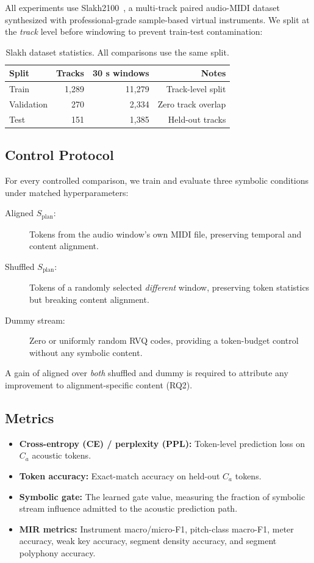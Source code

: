 \documentclass[11pt]{article}
\newcommand{\splan}{$S_{\mathrm{plan}}$}
\newcommand{\Camath}{C_a}
\begin{document}
All experiments use Slakh2100~\citep{manilow2019slakh}, a multi-track paired
audio-MIDI dataset synthesized with professional-grade sample-based virtual instruments.
We split at the \emph{track} level before windowing to prevent train-test contamination:

\begin{table}[h]
\centering
\small
\begin{tabular}{lrrr}
\toprule
Split & Tracks & 30 s windows & Notes \\
\midrule
Train      & 1,289 & 11,279 & Track-level split \\
Validation & 270   & 2,334  & Zero track overlap \\
Test       & 151   & 1,385  & Held-out tracks \\
\bottomrule
\end{tabular}
\caption{Slakh dataset statistics.  All comparisons use the same split.}
\label{tab:dataset}
\end{table}

\subsection{Control Protocol}

For every controlled comparison, we train and evaluate three symbolic conditions under
matched hyperparameters:
\begin{description}
  \item[Aligned \splan{}:] Tokens from the audio window's own MIDI file, preserving
    temporal and content alignment.
  \item[Shuffled \splan{}:] Tokens of a randomly selected \emph{different} window,
    preserving token statistics but breaking content alignment.
  \item[Dummy stream:] Zero or uniformly random RVQ codes, providing a token-budget
    control without any symbolic content.
\end{description}

A gain of aligned over \emph{both} shuffled and dummy is required to attribute any
improvement to alignment-specific content (RQ2).

\subsection{Metrics}

\begin{itemize}
  \item \textbf{Cross-entropy (CE) / perplexity (PPL):} Token-level prediction loss
    on $\Camath$ acoustic tokens.
  \item \textbf{Token accuracy:} Exact-match accuracy on held-out $\Camath$ tokens.
  \item \textbf{Symbolic gate:} The learned gate value, measuring the fraction of
    symbolic stream influence admitted to the acoustic prediction path.
  \item \textbf{MIR metrics:} Instrument macro/micro-F1, pitch-class macro-F1, meter
    accuracy, weak key accuracy, segment density accuracy, and segment polyphony accuracy.
\end{itemize}
\end{document}
